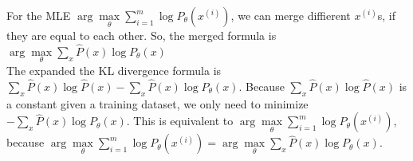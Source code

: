 \begin{answer}
For the MLE $\arg \max\limits_\theta \sum\limits_{i=1}^m \log P_\theta(x^{(i)})$, we can merge diffierent $x^{(i)}$s, if they are equal to each other. So, the merged formula is $\arg \max\limits_\theta \sum\limits_x \hat{P}(x) \log P_\theta(x)$\\
The expanded the KL divergence formula is $\sum\limits_x \hat{P}(x) \log\hat{P}(x) - \sum\limits_x \hat{P}(x) \log P_\theta(x)$. Because $\sum\limits_x \hat{P}(x) \log\hat{P}(x)$ is a constant given a training dataset, we only need to minimize $- \sum\limits_x \hat{P}(x) \log P_\theta(x)$. This is equivalent to $\arg \max\limits_\theta \sum\limits_{i=1}^m \log P_\theta(x^{(i)})$, because $\arg \max\limits_\theta \sum\limits_{i=1}^m \log P_\theta(x^{(i)}) = \arg \max\limits_\theta \sum\limits_x \hat{P}(x) \log P_\theta(x)$.
\end{answer}
